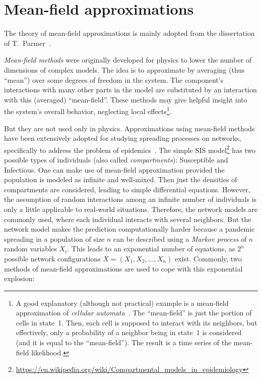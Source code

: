 \documentclass[
	digital, oneside, nosansbold, nocolorbold, nolot, nolof
]{fithesis4}
\theoremstyle{definition}
\theoremstyle{definition}
\begin{document}
\section{Mean-field approximations}

The theory of mean-field approximations is mainly adopted from the dissertation
of T.~Parmer~\cite{parmer_phd}.

\emph{Mean-field methods} were originally developed for physics to lower the
number of dimensions of complex models. The idea is to approximate by averaging
(thus \enquote{mean}) over some degrees of freedom in the system. The
component's interactions with many other parts in the model are substituted by
an interaction with this (averaged) \enquote{mean-field}. These methods may
give helpful insight into the system's overall behavior, neglecting local
effects\footnote{A good explanatory (although not practical) example is a
    mean-field approximation of \emph{cellular automata}~\cite{mean_field_ca}.
    The \enquote{mean-field} is just the portion of cells in state~1. Then,
    each cell is supposed to interact with its neighbors, but effectively, only
    a probability of a neighbor being in state~1 is considered (and it is equal
    to the \enquote{mean-field}). The result is a time series of the
    mean-field likelihood.}.

But they are not used only in physics. Approximations using mean-field methods
have been extensively adopted for studying spreading processes on networks,
specifically to address the problem of epidemics~\cite{pastor_epidemic,
yang_epidemic}. The simple SIS
model\footnote{\url{https://en.wikipedia.org/wiki/Compartmental_models_in_epidemiology}}
has two possible types of individuals (also called \emph{compartments}):
Susceptible and Infectious. One can make use of mean-field approximation
provided the population is modeled as infinite and well-mixed.  Then just the
densities of compartments are considered, leading to simple differential
equations. However, the assumption of random interactions among an infinite
number of individuals is only a little applicable to real-world situations.
Therefore, the network models are commonly used, where each individual
interacts with several neighbors. But the network model makes the prediction
computationally harder because a pandemic spreading in a population of size $n$
can be described using a \emph{Markov process} of $n$ random variables $X_i$.
This leads to an exponential number of equations, as $2^n$ possible network
configurations $X = (X_1, X_2, \ldots, X_n)$ exist. Commonly, two methods of
mean-field approximations are used to cope with this exponential explosion:
\end{document}
